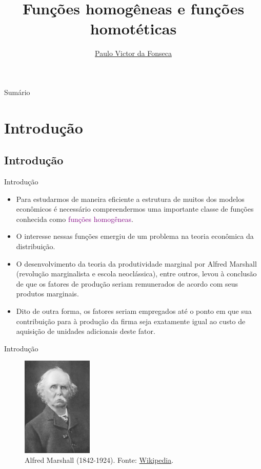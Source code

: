 \documentclass[10pt]{beamer}
\title[]{Funções homogêneas e funções homotéticas}
\author[]{\href{https://pvfonseca.github.io/}{Paulo Victor da Fonseca}}
\date{}
\begin{document}
\begin{frame}[plain]
\end{frame}

\begin{frame}{Sumário}
    \tableofcontents
\end{frame}

\section{Introdução}
\subsection{Introdução}
\begin{frame}{Introdução}
    \begin{itemize}
        \item Para estudarmos de maneira eficiente a estrutura de muitos dos modelos econômicos é necessário compreendermos uma importante classe de funções conhecida como \textcolor{purple}{funções homogêneas}.
         \bigskip
        \item O interesse nessas funções emergiu de um problema na teoria econômica da distribuição.
        \bigskip
        \item O desenvolvimento da teoria da produtividade marginal por Alfred Marshall (revolução marginalista e escola neoclássica), entre outros, levou à conclusão de que os fatores de produção seriam remunerados de acordo com seus produtos marginais.
        \bigskip
        \item Dito de outra forma, os fatores seriam empregados até o ponto em que sua contribuição para à produção da firma seja exatamente igual ao custo de aquisição de unidades adicionais deste fator.
    \end{itemize}
\end{frame}

\begin{frame}{Introdução}
    \begin{figure}
        \centering
        \includegraphics[width=0.3\textwidth]{./figures/aula14_fig1.jpg}
        \caption{Alfred Marshall (1842-1924). Fonte: \href{https://en.wikipedia.org/wiki/Alfred_Marshall}{Wikipedia}.}
        \label{a.marshall}
    \end{figure}
\end{frame}
\end{document}
